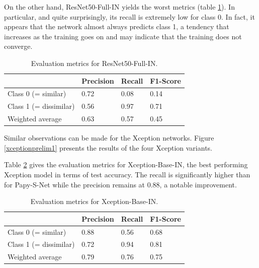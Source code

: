 \documentclass[11pt]{report}
\begin{document}
On the other hand, ResNet50-Full-IN yields the worst metrics (table \ref{tab:tabresprel2}). In particular, and quite surprisingly, its recall is extremely low for class 0. In fact, it appears that the network almost always predicts class 1, a tendency that increases as the training goes on and may indicate that the training does not converge.\newline

\begin{table}[h!]
\begin{tabular}{l|l|l|l|}
\cline{2-4}
                                             & Precision & Recall & F1-Score \\ \hline
\multicolumn{1}{|l|}{Class 0 (= similar)}    & 0.72      & 0.08   & 0.14     \\ \cline{1-1}
\multicolumn{1}{|l|}{Class 1 (= dissimilar)} & 0.56      & 0.97   & 0.71     \\ \hline
\multicolumn{1}{|l|}{Weighted average}       & 0.63      & 0.57   & 0.45     \\ \hline
\end{tabular}
\caption{Evaluation metrics for ResNet50-Full-IN.}
\label{tab:tabresprel2}
\end{table}

Similar observations can be made for the Xception networks. Figure \ref{xceptionprelim1} presents the results of the four Xception variants.


Table \ref{tab:tabxcepprel1} gives the evaluation metrics for Xception-Base-IN, the best performing Xception model in terms of test  accuracy. The recall is significantly higher than for Papy-S-Net while the precision remains at 0.88, a notable improvement.

\begin{table}[h!]
\begin{tabular}{l|l|l|l|}
\cline{2-4}
                                             & Precision & Recall & F1-Score \\ \hline
\multicolumn{1}{|l|}{Class 0 (= similar)}    & 0.88      & 0.56   & 0.68     \\ \cline{1-1}
\multicolumn{1}{|l|}{Class 1 (= dissimilar)} & 0.72      & 0.94   & 0.81     \\ \hline
\multicolumn{1}{|l|}{Weighted average}       & 0.79      & 0.76   & 0.75     \\ \hline
\end{tabular}
\caption{Evaluation metrics for Xception-Base-IN.}
\label{tab:tabxcepprel1}
\end{table}
\end{document}

